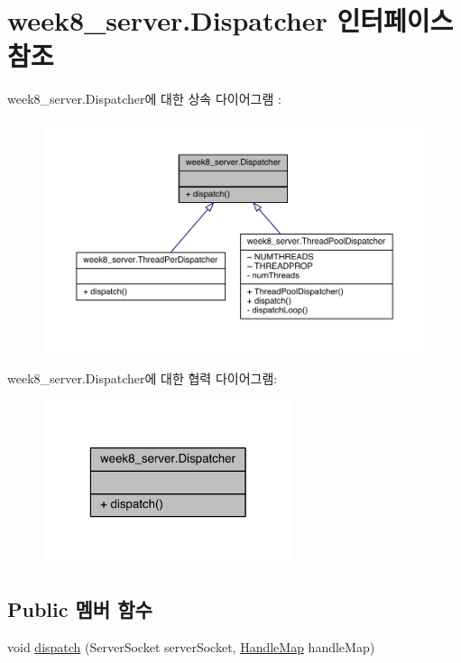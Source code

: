 \hypertarget{interfaceweek8__server_1_1_dispatcher}{\section{week8\-\_\-server.\-Dispatcher 인터페이스 참조}
\label{interfaceweek8__server_1_1_dispatcher}
}


week8\-\_\-server.\-Dispatcher에 대한 상속 다이어그램 \-: 
\nopagebreak
\begin{figure}[H]
\begin{center}
\leavevmode
\includegraphics[width=350pt]{interfaceweek8__server_1_1_dispatcher__inherit__graph}
\end{center}
\end{figure}


week8\-\_\-server.\-Dispatcher에 대한 협력 다이어그램\-:
\nopagebreak
\begin{figure}[H]
\begin{center}
\leavevmode
\includegraphics[width=208pt]{interfaceweek8__server_1_1_dispatcher__coll__graph}
\end{center}
\end{figure}
\subsection*{Public 멤버 함수}
\begin{DoxyCompactItemize}
\item 
void \hyperlink{interfaceweek8__server_1_1_dispatcher_a29b5387e03751725f89de08211e638b7}{dispatch} (Server\-Socket server\-Socket, \hyperlink{classweek8__server_1_1_handle_map}{Handle\-Map} handle\-Map)
\end{DoxyCompactItemize}


